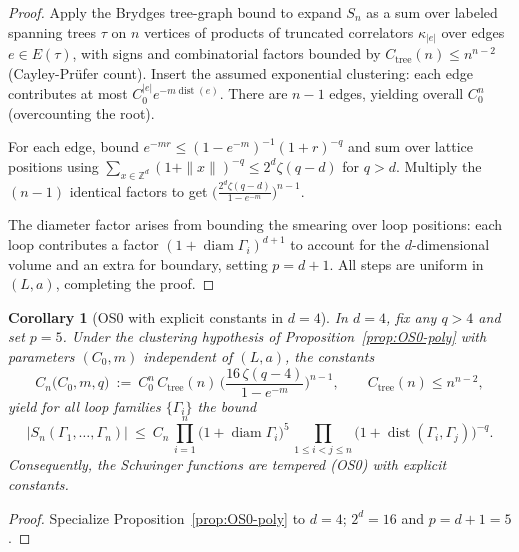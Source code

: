 \documentclass[11pt]{amsart}
\theoremstyle{plain}
\newtheorem{corollary}[theorem]{Corollary}
\theoremstyle{definition}
\theoremstyle{remark}
\begin{document}
\begin{proof}
Apply the Brydges tree-graph bound \cite{Brydges1978} to expand $S_n$ as a sum over labeled spanning trees $\tau$ on $n$ vertices of products of truncated correlators $\kappa_{|e|}$ over edges $e\in E(\tau)$, with signs and combinatorial factors bounded by $C_{\mathrm{tree}}(n)\le n^{n-2}$ (Cayley-Prüfer count). Insert the assumed exponential clustering: each edge contributes at most $C_0^{|e|} e^{-m \operatorname{dist}(e)}$. There are $n-1$ edges, yielding overall $C_0^n$ (overcounting the root).

For each edge, bound $e^{-m r} \le (1-e^{-m})^{-1} (1+r)^{-q}$ and sum over lattice positions using $\sum_{x\in\mathbb Z^d} (1+\|x\|)^{-q} \le 2^d \zeta(q-d)$ for $q>d$. Multiply the $(n-1)$ identical factors to get $\bigl(\frac{2^d \zeta(q-d)}{1-e^{-m}}\bigr)^{n-1}$.

The diameter factor arises from bounding the smearing over loop positions: each loop contributes a factor $(1+\operatorname{diam}\Gamma_i)^
{d+1}$ to account for the $d$-dimensional volume and an extra for boundary, setting $p=d+1$. All steps are uniform in $(L,a)$, completing the proof.
\end{proof}

\begin{corollary}[OS0 with explicit constants in $d=4$]\label{cor:os0-explicit-4d}
In $d=4$, fix any $q>4$ and set $p=5$. Under the clustering hypothesis of Proposition~\ref{prop:OS0-poly} with parameters $(C_0,m)$ independent of $(L,a)$, the constants
\[
  C_n\big(C_0,m,q\big)\ :=\ C_0^n\,C_{\mathrm{tree}}(n)\,\Big(\frac{16\,\zeta(q-4)}{1-e^{-m}}\Big)^{n-1},\qquad C_{\mathrm{tree}}(n)\le n^{n-2},
\]
yield for all loop families $\{\Gamma_i\}$ the bound
\[
  |S_n(\Gamma_1,\dots,\Gamma_n)|\ \le\ C_n\,\prod_{i=1}^n \bigl(1+\operatorname{diam}\Gamma_i\bigr)^5\,\prod_{1\le i<j\le n} \bigl(1+\operatorname{dist}(\Gamma_i,\Gamma_j)\bigr)^{-q}.
\]
Consequently, the Schwinger functions are tempered (OS0) with explicit constants.
\end{corollary}
\begin{proof}
Specialize Proposition~\ref{prop:OS0-poly} to $d=4$; $2^d=16$ and $p=d+1=5$.
\end{proof}
\end{document}
